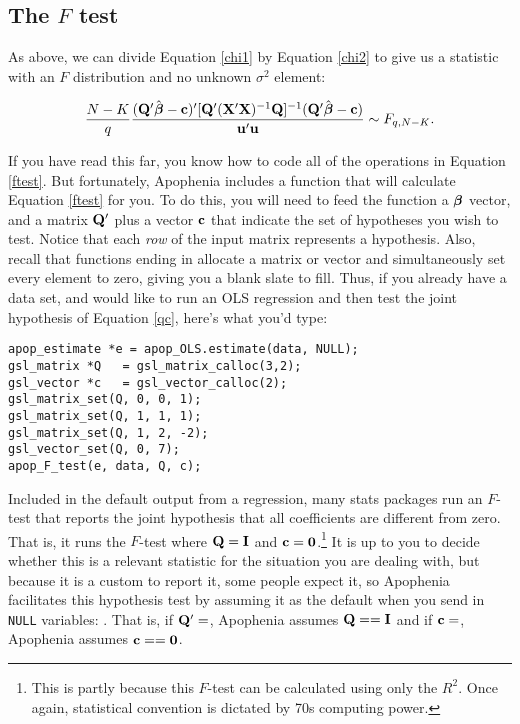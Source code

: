 \subsection{The $F$ test}\label{ftestsec}

As above, we can divide Equation \ref{chi1} by Equation \ref{chi2}
to give us a statistic with an $F$ distribution and no unknown
$\sigma^2$ element:

\begin{equation}	
{N-K\over q}
{({\bf Q}'\hat{{\mbox{\boldmath$\beta$}}}- {\bf c})' [{\bf Q}' ({\bf X}'{\bf X})^{-1} {\bf Q}]^{-1} ({\bf Q}' \hat{{\mbox{\boldmath$\beta$}}}- {\bf c})
\over {\bf u}' {\bf u}} \sim F_{q,N-K}. \label{ftest}
\end{equation}	

If you have read this far, you know how to code all of the operations
in Equation \ref{ftest}.  But fortunately, 
Apophenia includes a function that will calculate Equation \ref{ftest}
for you.
To do this, you will need to feed the function a ${\mbox{\boldmath$\beta$}}$ vector, and a
matrix ${\bf Q}'$ plus a vector ${\bf c}$ that indicate the set of hypotheses
you wish to test. Notice that each {\em row} of the input matrix represents a
hypothesis. Also, recall that functions ending in  allocate
a matrix or vector and simultaneously set every element to zero, giving
you a blank slate to fill. Thus, if you already have a data set, and
would like to run an OLS regression and then test the joint hypothesis
of Equation \ref{qc}, here's what you'd type:
\begin{lstlisting}
apop_estimate *e = apop_OLS.estimate(data, NULL);
gsl_matrix *Q   = gsl_matrix_calloc(3,2);
gsl_vector *c   = gsl_vector_calloc(2);
gsl_matrix_set(Q, 0, 0, 1);
gsl_matrix_set(Q, 1, 1, 1);
gsl_matrix_set(Q, 1, 2, -2);
gsl_vector_set(Q, 0, 7);
apop_F_test(e, data, Q, c);
\end{lstlisting}

Included in the default output from a regression,
many stats packages run an $F$-test that reports the
joint hypothesis that all coefficients are different from zero. That is,
it runs the $F$-test where ${\bf Q} = {\bf I}$ and ${\bf c} = {\bf 0}$.\footnote{This is
partly because this $F$-test can be calculated using only the $R^2$.
Once again, statistical convention is dictated by 70s computing power.
}
It is up to you
to decide whether this is a relevant statistic for the situation you are
dealing with, but because it is a custom to report it, some
people expect it, so Apophenia facilitates this hypothesis test by
assuming it as the default when you send in {\tt NULL} variables:
. That is,
if ${\bf Q}'=$, Apophenia assumes ${\bf Q}=={\bf I}$ and if
${\bf c}=$, Apophenia assumes ${\bf c} == {\bf 0}$.




